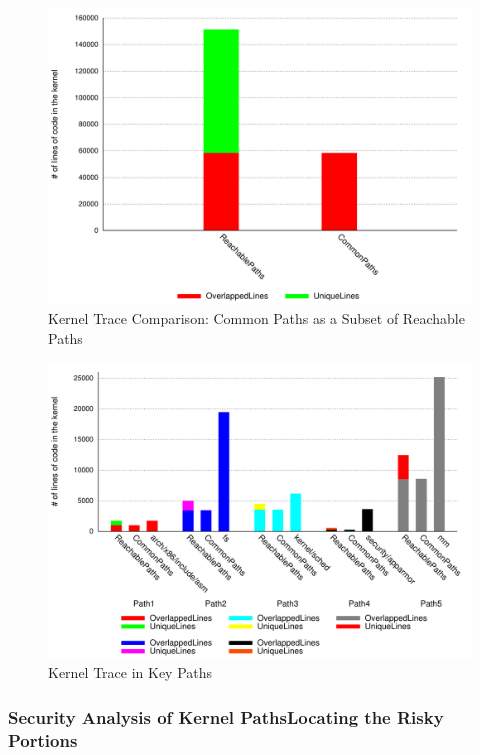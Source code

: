 \begin{figure}
\centering
\includegraphics[width=1.0\columnwidth]{diagram/lind_oakland16_diagram_01.pdf}
\caption{Kernel Trace Comparison: Common Paths as a Subset of Reachable Paths}
\label{fig:subset}
\end{figure}

\begin{figure}
\centering
\includegraphics[width=1.0\columnwidth]{diagram/lind_oakland16_diagram_02.pdf}
\caption{Kernel Trace in Key Paths}
\label{fig:key_paths_trace}
\end{figure}

\subsubsection{Security Analysis of Kernel Paths\textendash Locating the Risky Portions}

